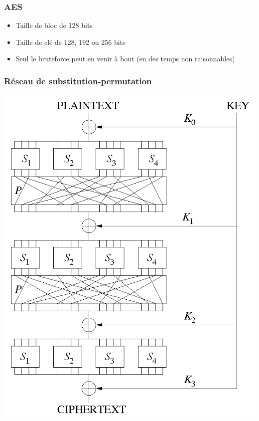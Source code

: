 \documentclass{beamer}
\begin{document}
    \subsubsection{AES}

    \begin{frame}
        \begin{itemize}
            \item Taille de bloc de 128 bits
            \item Taille de clé de 128, 192 ou 256 bits
            \item Seul le bruteforce peut en venir à bout (en des temps non raisonnables)
        \end{itemize}
    \end{frame}

    \begin{frame}
    \frametitle{Réseau de substitution-permutation}

    \begin{center} \includegraphics[scale=0.30]{figures/substitutionpermutationnetwork.png} \end{center}

    \end{frame}
\end{document}
